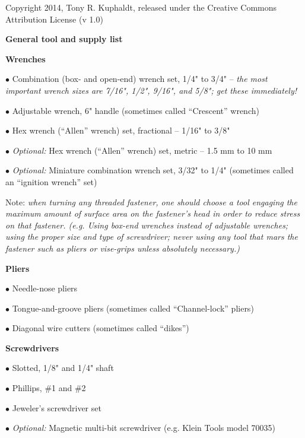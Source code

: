 
 Copyright 2014, Tony R. Kuphaldt, released under the Creative Commons Attribution License (v 1.0)


\centerline{\bf General tool and supply list}

\vskip 10pt

\noindent
{\bf Wrenches}

\item{$\bullet$} Combination (box- and open-end) wrench set, 1/4" to 3/4" -- {\it the most important wrench sizes are 7/16", 1/2", 9/16", and 5/8"; get these immediately!}
\item{$\bullet$} Adjustable wrench, 6" handle (sometimes called ``Crescent'' wrench)
\item{$\bullet$} Hex wrench (``Allen'' wrench) set, fractional -- 1/16" to 3/8"
\item{$\bullet$} {\it Optional:} Hex wrench (``Allen'' wrench) set, metric -- 1.5 mm to 10 mm
\item{$\bullet$} {\it Optional:} Miniature combination wrench set, 3/32" to 1/4" (sometimes called an ``ignition wrench'' set)

\vskip 5pt

Note: {\it when turning any threaded fastener, one should choose a tool engaging the maximum amount of surface area on the fastener's head in order to reduce stress on that fastener.  (e.g. Using box-end wrenches instead of adjustable wrenches; using the proper size and type of screwdriver; never using any tool that mars the fastener such as pliers or vise-grips unless absolutely necessary.)}

\vskip 10pt

\noindent
{\bf Pliers}

\item{$\bullet$} Needle-nose pliers
\item{$\bullet$} Tongue-and-groove pliers (sometimes called ``Channel-lock'' pliers)
\item{$\bullet$} Diagonal wire cutters (sometimes called ``dikes'')
\medskip

\vskip 10pt

\noindent
{\bf Screwdrivers}

\item{$\bullet$} Slotted, 1/8" and 1/4" shaft
\item{$\bullet$} Phillips, \#1 and \#2
\item{$\bullet$} Jeweler's screwdriver set
\item{$\bullet$} {\it Optional:} Magnetic multi-bit screwdriver (e.g. Klein Tools model 70035)

